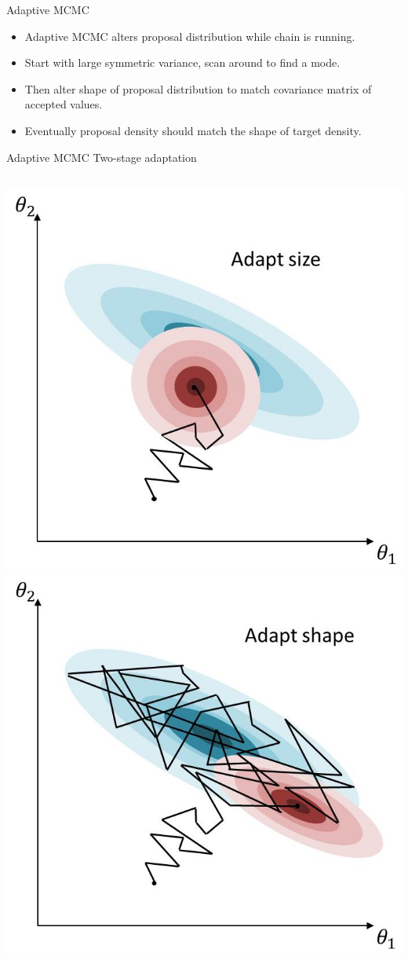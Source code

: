 \documentclass[compress]{beamer}
\begin{document}
\begin{frame}[label=sec-8-7]{Adaptive MCMC}
\begin{itemize}
\item \alert{Adaptive MCMC} alters proposal distribution while chain is running. 
\item Start with large symmetric variance, scan around to find a mode. 
\item Then alter shape of proposal distribution to match covariance matrix of accepted values.
\item Eventually proposal density should match the shape of target density.
\end{itemize}
\end{frame}

\begin{frame}[label=sec-8-8]{Adaptive MCMC}
Two-stage adaptation
\begin{columns}[c] 
\includegraphics[width=.8\linewidth]{MH7}
\includegraphics[width=.8\linewidth]{MH8}
\end{columns}
\end{frame}
\end{document}
